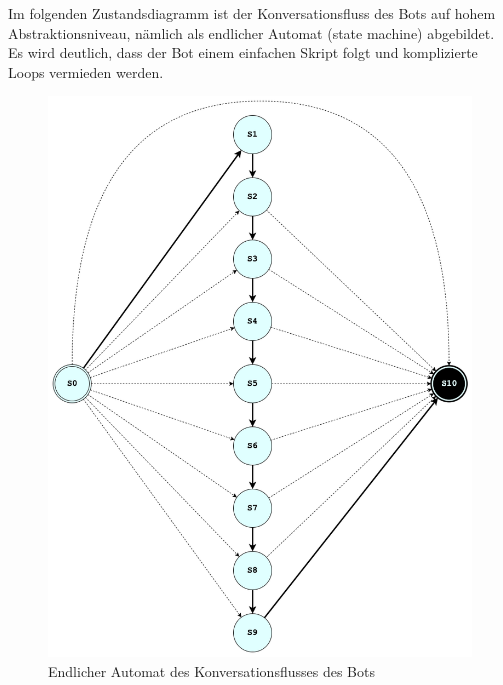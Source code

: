 	Im folgenden Zustandsdiagramm ist der Konversationsfluss des Bots auf hohem Abstraktionsniveau, nämlich als endlicher Automat (state machine) abgebildet. Es wird deutlich, dass der Bot einem einfachen Skript folgt und komplizierte Loops vermieden werden. 
	\begin{figure} %
		\centering
		\includegraphics[width=1.0\textwidth]{images/220320_PA28464_State-Machine.png}
		\caption{Endlicher Automat des Konversationsflusses des Bots}
		\label{fig: state machine}
	\end{figure}

